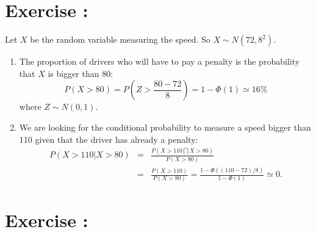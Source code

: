 \documentclass[12pt,thmsa]{article}
\begin{document}
\addtocounter{section}{1}
\section*{Exercise \thesection:}

Let $X$ be the random variable measuring the speed. So $X \sim N(72,8^2)$.
\begin{enumerate}
  \item The proportion of drivers who will have to pay a penalty is the probability that $X$ is
  bigger than  80:
\begin{equation*}
P(X>80)= P\left(Z>\frac{80-72}{8} \right)=1-\Phi(1) \simeq 16 \%
\end{equation*}
where $Z \sim N(0,1)$.
  \item We are looking for the conditional probability to measure a speed bigger than 110 given that the driver has already a penalty:
  \begin{eqnarray*}
  P(X>110 \vert X>80) &=&  \frac{P(X>110 \bigcap X>80)}{P(X>80)} \\
   &=& \frac{P(X>110)}{P(X>80)} = \frac{1- \Phi((110-72)/8)}{1-\Phi(1)}\simeq 0.
  \end{eqnarray*}


\end{enumerate}


\addtocounter{section}{1}
\section*{Exercise \thesection:}
\end{document}
